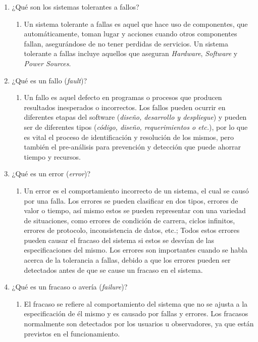 \documentclass{dense_template}
\begin{document}
\begin{enumerate}
    \item ¿Qué son los sistemas tolerantes a fallos?
    \begin{enumerate}
        \item Un sistema tolerante a fallas es aquel que hace uso de componentes, que automáticamente, toman lugar y acciones cuando otros componentes fallan, asegurándose de no tener perdidas de servicios. Un sistema tolerante a fallas incluye aquellos que aseguran \textit{Hardware}, \textit{Software} y \textit{Power Sources}.
    \end{enumerate}
    \item ¿Qué es un fallo (\textit{fault})?
    \begin{enumerate}
        \item Un fallo es aquel defecto en programas o procesos que producen resultados inesperados o incorrectos. Los fallos pueden ocurrir en diferentes etapas del software (\textit{diseño, desarrollo y despliegue}) y pueden ser de diferentes tipos (\textit{código, diseño, requerimientos o etc.}), por lo que es vital el proceso de identificación y resolución de los mismos, pero también el pre-análisis para prevención y detección que puede ahorrar tiempo y recursos. 
    \end{enumerate}
    \item ¿Qué es un error (\textit{error})?
    \begin{enumerate}
        \item Un error es el comportamiento incorrecto de un sistema, el cual se causó por una falla. Los errores se pueden clasificar en dos tipos, errores de valor o tiempo, así mismo estos se pueden representar con una variedad de situaciones, como errores de condición de carrera, ciclos infinitos, errores de protocolo, inconsistencia de datos, etc.; Todos estos errores pueden causar el fracaso del sistema si estos se desvían de las especificaciones del mismo. Los errores son importantes cuando se habla acerca de la tolerancia a fallas, debido a que los errores pueden ser detectados antes de que se cause un fracaso en el sistema.
    \end{enumerate}
    \item ¿Qué es un fracaso o avería (\textit{failure})?
    \begin{enumerate}
        \item El fracaso se refiere al comportamiento del sistema que no se ajusta a la especificación de él mismo y es causado por fallas y errores. Los fracasos normalmente son detectados por los usuarios u observadores, ya que están previstos en el funcionamiento.

\end{enumerate}
\end{enumerate}
\end{document}
